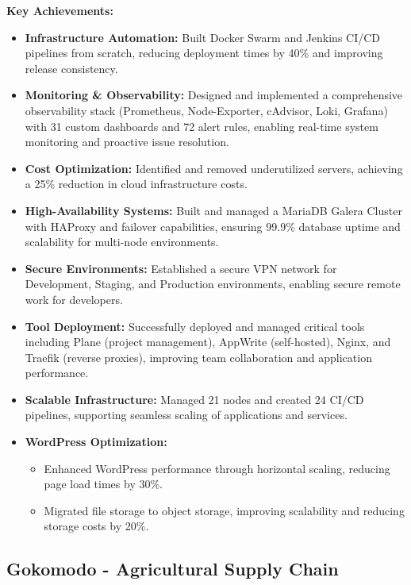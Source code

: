 \documentclass[11pt]{article}
\begin{document}
\begin{itemize}
    \textbf{Key Achievements:}
    \begin{itemize}
        \item \textbf{Infrastructure Automation:} Built Docker Swarm and Jenkins CI/CD pipelines from scratch, reducing deployment times by 40\% and improving release consistency.
        \item \textbf{Monitoring \& Observability:} Designed and implemented a comprehensive observability stack (Prometheus, Node-Exporter, cAdvisor, Loki, Grafana) with 31 custom dashboards and 72 alert rules, enabling real-time system monitoring and proactive issue resolution.
        \item \textbf{Cost Optimization:} Identified and removed underutilized servers, achieving a 25\% reduction in cloud infrastructure costs.
        \item \textbf{High-Availability Systems:} Built and managed a MariaDB Galera Cluster with HAProxy and failover capabilities, ensuring 99.9\% database uptime and scalability for multi-node environments.
        \item \textbf{Secure Environments:} Established a secure VPN network for Development, Staging, and Production environments, enabling secure remote work for developers.
        \item \textbf{Tool Deployment:} Successfully deployed and managed critical tools including Plane (project management), AppWrite (self-hosted), Nginx, and Traefik (reverse proxies), improving team collaboration and application performance.
        \item \textbf{Scalable Infrastructure:} Managed 21 nodes and created 24 CI/CD pipelines, supporting seamless scaling of applications and services.
        \item \textbf{WordPress Optimization:} 
        \begin{itemize}
            \item Enhanced WordPress performance through horizontal scaling, reducing page load times by 30\%.
            \item Migrated file storage to object storage, improving scalability and reducing storage costs by 20\%.
        \end{itemize}
    \end{itemize}
\end{itemize}

\subsection{Gokomodo - Agricultural Supply Chain}
\end{document}
